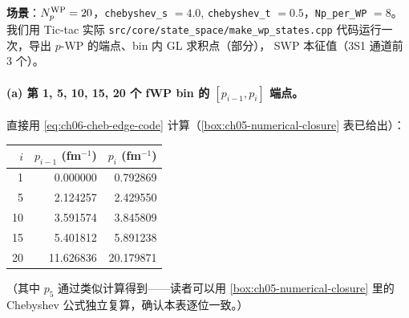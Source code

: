 \begin{numericalbox}[label={box:ch06-numerical-closure}]
\textbf{场景}：\({N_{p}^{\text{WP}}} = 20\)，\texttt{chebyshev\_s} \(= 4.0\),
\texttt{chebyshev\_t} \(= 0.5\)，\texttt{Np\_per\_WP} \(= 8\)。
我们用 Tic-tac 实际 \texttt{src/core/state\_space/make\_wp\_states.cpp}
代码运行一次，导出 \(p\)-WP 的端点、bin 内 GL 求积点（部分），
SWP 本征值（3S1 通道前 3 个）。

\paragraph{(a) 第 1, 5, 10, 15, 20 个 fWP bin 的 \([p_{i-1}, p_i]\) 端点。}
直接用 \cref{eq:ch06-cheb-edge-code} 计算（\cref{box:ch05-numerical-closure}
表已给出）：
\begin{center}
\begin{tabular}{rrr}
\toprule
\(i\) & \(p_{i-1}\) (fm\(^{-1}\)) & \(p_i\) (fm\(^{-1}\)) \\
\midrule
 1 &  0.000000 &  0.792869 \\
 5 &  2.124257 &  2.429550 \\
10 &  3.591574 &  3.845809 \\
15 &  5.401812 &  5.891238 \\
20 & 11.626836 & 20.179871 \\
\bottomrule
\end{tabular}
\end{center}
（其中 \(p_5\) 通过类似计算得到——读者可以用 \cref{box:ch05-numerical-closure}
里的 Chebyshev 公式独立复算，确认本表逐位一致。）


\end{numericalbox}
